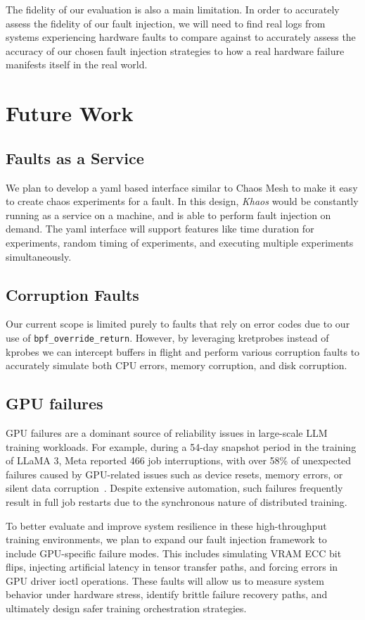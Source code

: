 The fidelity of our evaluation is also a main limitation. In order to accurately assess the fidelity of our fault injection, we will need to find real logs from systems experiencing hardware faults to compare against to accurately assess the accuracy of our chosen fault injection strategies to how a real hardware failure manifests itself in the real world.

\section{Future Work}

\subsection{Faults as a Service}
We plan to develop a yaml based interface similar to Chaos Mesh \cite{chaosmesh2023} to make it easy to create chaos experiments for a fault. In this design, \textit{Khaos} would be constantly running as a service on a machine, and is able to perform fault injection on demand. The yaml interface will support features like time duration for experiments, random timing of experiments, and executing multiple experiments simultaneously.

\subsection{Corruption Faults}
Our current scope is limited purely to faults that rely on error codes due to our use of \texttt{bpf\_override\_return}. However, by leveraging kretprobes instead of kprobes we can intercept buffers in flight and perform various corruption faults to accurately simulate both CPU errors, memory corruption, and disk corruption.

\subsection{GPU failures}
GPU failures are a dominant source of reliability issues in large-scale LLM training workloads. For example, during a 54-day snapshot period in the training of LLaMA 3, Meta reported 466 job interruptions, with over 58\% of unexpected failures caused by GPU-related issues such as device resets, memory errors, or silent data corruption~\cite{grattafiori2024llama3herdmodels}. Despite extensive automation, such failures frequently result in full job restarts due to the synchronous nature of distributed training.

To better evaluate and improve system resilience in these high-throughput training environments, we plan to expand our fault injection framework to include GPU-specific failure modes. This includes simulating VRAM ECC bit flips, injecting artificial latency in tensor transfer paths, and forcing errors in GPU driver ioctl operations. These faults will allow us to measure system behavior under hardware stress, identify brittle failure recovery paths, and ultimately design safer training orchestration strategies. 

